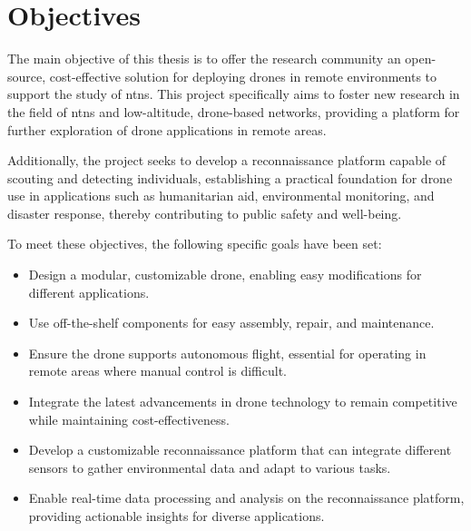 
\chapter{Objectives}\label{ch:objectives}

The main objective of this thesis is to offer the research community an open-source, cost-effective solution for deploying drones in remote environments to support the study of \glspl{ntn}. This project specifically aims to foster new research in the field of \glspl{ntn} and low-altitude, drone-based networks, providing a platform for further exploration of drone applications in remote areas.

Additionally, the project seeks to develop a reconnaissance platform capable of scouting and detecting individuals, establishing a practical foundation for drone use in applications such as humanitarian aid, environmental monitoring, and disaster response, thereby contributing to public safety and well-being.

To meet these objectives, the following specific goals have been set:

\begin{itemize}
  \item Design a modular, customizable drone, enabling easy modifications for different applications.

  \item Use off-the-shelf components for easy assembly, repair, and maintenance.

  \item Ensure the drone supports autonomous flight, essential for operating in remote areas where manual control is difficult.

  \item Integrate the latest advancements in drone technology to remain competitive while maintaining cost-effectiveness.

  \item Develop a customizable reconnaissance platform that can integrate different sensors to gather environmental data and adapt to various tasks.

  \item Enable real-time data processing and analysis on the reconnaissance platform, providing actionable insights for diverse applications.
\end{itemize}
